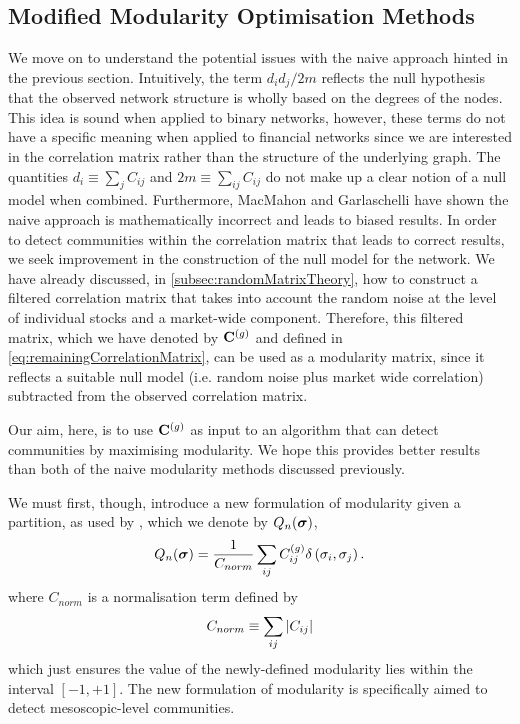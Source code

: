 
\subsection{Modified Modularity Optimisation Methods}
\label{subsec:modifiedModularityOptimisationMethods}

We move on to understand the potential issues with the naive approach hinted in the previous section. Intuitively, the term $d_{i}d_{j}/2m$ reflects the null hypothesis that the observed network structure is wholly based on the degrees of the nodes.
This idea is sound when applied to binary networks, however, these terms do not have a specific meaning when applied to financial networks since we are interested in the correlation matrix rather than the structure of the underlying graph.
The quantities $d_{i} \equiv \sum_{j} C_{ij}$ and $2m \equiv \sum_{ij} C_{ij}$ do not make up a clear notion of a null model when combined.
Furthermore, MacMahon and Garlaschelli \cite{MG13} have shown the naive approach is mathematically incorrect and leads to biased results.
In order to detect communities within the correlation matrix that leads to correct results, we seek improvement in the construction of the null model for the network.
We have already discussed, in \cref{subsec:randomMatrixTheory}, how to construct a filtered correlation matrix that takes into account the random noise at the level of individual stocks and a market-wide component.
Therefore, this filtered matrix, which we have denoted by $\mathbf C^{(g)}$ and defined in \cref{eq:remainingCorrelationMatrix}, can be used as a modularity matrix, since it reflects a suitable null model (i.e. random noise plus market wide correlation) subtracted from the observed correlation matrix.

Our aim, here, is to use $\mathbf C^{(g)}$ as input to an algorithm that can detect communities by maximising modularity.
We hope this provides better results than both of the naive modularity methods discussed previously.

We must first, though, introduce a new formulation of modularity given a partition, as used by \cite{MG13}, which we denote by $Q_{n}(\vecvar{\sigma})$,
\begin{equation}
\label{eq:newModularityFinancialNetworks}
	Q_{n}(\vecvar{\sigma}) = \frac{1}{C_{norm}} \sum_{ij} C^{(g)}_{ij} \delta \left( \sigma_{i},\sigma_{j} \right).
\end{equation}
where $C_{norm}$ is a normalisation term defined by 
\begin{equation}
\label{eq:newModularityNormalisationConstantFinancialNetworks}
	C_{norm} \equiv \sum_{ij} \left\vert C_{ij}\right\vert
\end{equation}
which just ensures the value of the newly-defined modularity lies within the interval $[-1,+1]$.
The new formulation of modularity is specifically aimed to detect mesoscopic-level communities.

